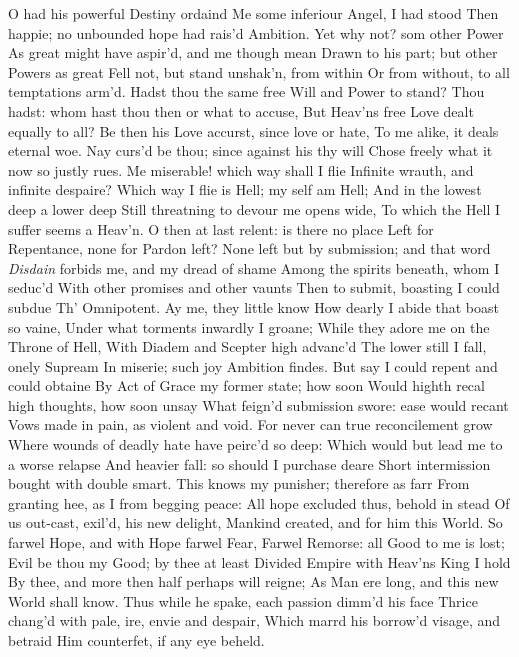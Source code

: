 \documentclass[11pt]{book}
\newcounter {last}
\begin{document}
O had his powerful Destiny ordaind 
Me some inferiour Angel, I had stood 
Then happie; no unbounded hope had rais'd 
Ambition.  Yet why not? som other Power 
As great might have aspir'd, and me though mean 
Drawn to his part; but other Powers as great 
Fell not, but stand unshak'n, from within 
Or from without, to all temptations arm'd. 
Hadst thou the same free Will and Power to stand? 
Thou hadst: whom hast thou then or what to accuse, 
But Heav'ns free Love dealt equally to all? 
Be then his Love accurst, since love or hate, 
To me alike, it deals eternal woe. 
Nay curs'd be thou; since against his thy will 
Chose freely what it now so justly rues. 
Me miserable! which way shall I flie 
Infinite wrauth, and infinite despaire? 
Which way I flie is Hell; my self am Hell; 
And in the lowest deep a lower deep 
Still threatning to devour me opens wide, 
To which the Hell I suffer seems a Heav'n. 
O then at last relent: is there no place 
Left for Repentance, none for Pardon left? 
None left but by submission; and that word 
\textit{Disdain} forbids me, and my dread of shame 
Among the spirits beneath, whom I seduc'd 
With other promises and other vaunts 
Then to submit, boasting I could subdue 
Th' Omnipotent.  Ay me, they little know 
How dearly I abide that boast so vaine, 
Under what torments inwardly I groane; 
While they adore me on the Throne of Hell, 
With Diadem and Scepter high advanc'd 
The lower still I fall, onely Supream 
In miserie; such joy Ambition findes. 
But say I could repent and could obtaine 
By Act of Grace my former state; how soon 
Would highth recal high thoughts, how soon unsay 
What feign'd submission swore: ease would recant 
Vows made in pain, as violent and void. 
For never can true reconcilement grow 
Where wounds of deadly hate have peirc'd so deep: 
Which would but lead me to a worse relapse 
And heavier fall: so should I purchase deare 
Short intermission bought with double smart. 
This knows my punisher; therefore as farr 
From granting hee, as I from begging peace: 
All hope excluded thus, behold in stead 
Of us out-cast, exil'd, his new delight, 
Mankind created, and for him this World. 
So farwel Hope, and with Hope farwel Fear, 
Farwel Remorse: all Good to me is lost; 
Evil be thou my Good; by thee at least 
Divided Empire with Heav'ns King I hold 
By thee, and more then half perhaps will reigne; 
As Man ere long, and this new World shall know. 
\quad Thus while he spake, each passion dimm'd his face 
Thrice chang'd with pale, ire, envie and despair, 
Which marrd his borrow'd visage, and betraid 
Him counterfet, if any eye beheld. 
\end{document}
